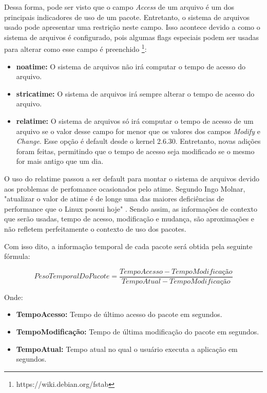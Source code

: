 Dessa forma, pode ser visto que o campo \textit{Access} de um arquivo é um dos
principais indicadores de uso de um pacote. Entretanto, o sistema de arquivos
usado pode apresentar uma
restrição neste campo. Isso acontece devido a como o sistema de arquivos é
configurado, pois algumas flags especiais podem ser usadas para alterar como
esse campo é preenchido \footnote{https://wiki.debian.org/fstab}:

\begin{itemize}
    \item \textbf{noatime:} O sistema de arquivos não irá computar o tempo de
        acesso do arquivo.
    \item \textbf{stricatime:} O sistema de arquivos irá sempre alterar o tempo
        de acesso do arquivo.
    \item \textbf{relatime:} O sistema de arquivos só irá computar o tempo de
        acesso de um arquivo se o valor desse campo for menor que os valores dos
        campos \textit{Modify} e \textit{Change}. Esse opção é default desde
        o kernel 2.6.30. Entretanto, novas adições foram feitas, permitindo que
        o tempo de acesso seja modificado se o mesmo for mais antigo que um dia.
\end{itemize}

O uso do relatime passou a ser default para montar o sistema de arquivos devido
aos problemas de perfomance ocasionados pelo atime. Segundo Ingo Molnar, "atualizar o valor
de atime é de longe uma das maiores deficiências de performance que o Linux possui
hoje" \cite{3_corbet_2007}. Sendo assim, as informações de contexto que serão
usadas, tempo de acesso, modificação e mudança, são aproximações e não
refletem perfeitamente o contexto de uso dos pacotes.

Com isso dito, a informação temporal de cada pacote será obtida pela seguinte
fórmula:

\begin{equation} \label{eq:peso_temporal_do_pacote}
PesoTemporalDoPacote = \frac{TempoAcesso - TempoModificação}{TempoAtual -
TempoModificação}
\end{equation}


Onde:

\begin{itemize}
    \item \textbf{TempoAcesso:} Tempo de último acesso do pacote em segundos.
    \item \textbf{TempoModificação:} Tempo de última modificação do pacote em
        segundos.
    \item \textbf{TempoAtual:} Tempo atual no qual o usuário executa a
        aplicação em segundos.
\end{itemize}


